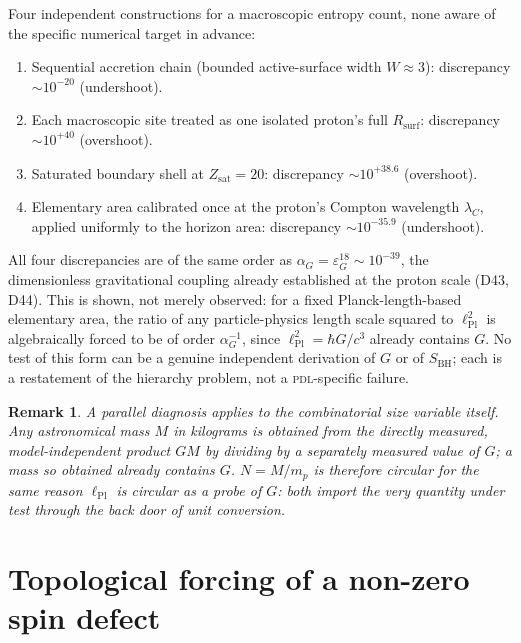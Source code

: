 \documentclass[12pt,a4paper]{article}
\newtheorem{remark}[theorem]{Remark}
\newcommand{\hb}{\hbar}
\newcommand{\PDL}{\textsc{pdl}}
\newcommand{\Rsurf}{R_{\mathrm{surf}}}
\newcommand{\SBH}{S_{\mathrm{BH}}}
\newcommand{\lPl}{\ell_{\mathrm{Pl}}}
\newcommand{\lamC}{\lambda_C}
\newcommand{\Zsat}{Z_{\mathrm{sat}}}
\begin{document}
\begin{negativebox}
Four independent constructions for a macroscopic entropy count,
none aware of the specific numerical target in advance:
\begin{enumerate}[nosep]
\item Sequential accretion chain (bounded active-surface width
$W\approx3$): discrepancy $\sim10^{-20}$ (undershoot).
\item Each macroscopic site treated as one isolated proton's full
$\Rsurf$: discrepancy $\sim10^{+40}$ (overshoot).
\item Saturated boundary shell at $\Zsat=20$: discrepancy
$\sim10^{+38.6}$ (overshoot).
\item Elementary area calibrated once at the proton's Compton
wavelength $\lamC$, applied uniformly to the horizon area:
discrepancy $\sim10^{-35.9}$ (undershoot).
\end{enumerate}
All four discrepancies are of the same order as
$\alpha_G=\varepsilon_G^{18}\sim10^{-39}$, the dimensionless
gravitational coupling already established at the proton scale
(D43, D44). This is shown, not merely observed: for a fixed
Planck-length-based elementary area, the ratio of any
particle-physics length scale squared to $\lPl^2$ is algebraically
forced to be of order $\alpha_G^{-1}$, since $\lPl^2=\hb G/c^3$
already contains $G$. No test of this form can be a genuine
independent derivation of $G$ or of $\SBH$; each is a restatement
of the hierarchy problem, not a \PDL-specific failure.
\end{negativebox}

\begin{remark}
A parallel diagnosis applies to the combinatorial size variable
itself. Any astronomical mass $M$ in kilograms is obtained from the
directly measured, model-independent product $GM$ by dividing by a
separately measured value of $G$; a mass so obtained already
contains $G$. $N=M/m_p$ is therefore circular for the same reason
$\lPl$ is circular as a probe of $G$: both import the very quantity
under test through the back door of unit conversion.
\end{remark}

\section{Topological forcing of a non-zero spin defect}
\label{sec:topology}
\end{document}
